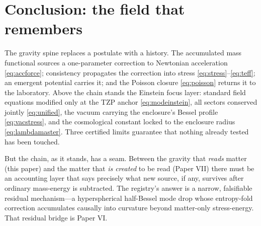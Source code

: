 \documentclass[11pt]{article}
\theoremstyle{remark}
\begin{document}
\section{Conclusion: the field that remembers}
\label{sec:conclusion}

The gravity spine replaces a postulate with a history. The accumulated mass functional sources a one-parameter correction to Newtonian acceleration \eqref{eq:accforce}; consistency propagates the correction into stress \eqref{eq:stress}--\eqref{eq:teff}; an emergent potential carries it; and the Poisson closure \eqref{eq:poisson} returns it to the laboratory. Above the chain stands the Einstein focus layer: standard field equations modified only at the TZP anchor \eqref{eq:modeinstein}, all sectors conserved jointly \eqref{eq:unified}, the vacuum carrying the enclosure's Bessel profile \eqref{eq:vacstress}, and the cosmological constant locked to the enclosure radius \eqref{eq:lambdamaster}. Three certified limits guarantee that nothing already tested has been touched.

But the chain, as it stands, has a seam. Between the gravity that \emph{reads} matter (this paper) and the matter that \emph{is created} to be read (Paper VII) there must be an accounting layer that says precisely what new source, if any, survives after ordinary mass-energy is subtracted. The registry's answer is a narrow, falsifiable residual mechanism---a hyperspherical half-Bessel mode drop whose entropy-fold correction accumulates causally into curvature beyond matter-only stress-energy. That residual bridge is Paper VI.
\end{document}
